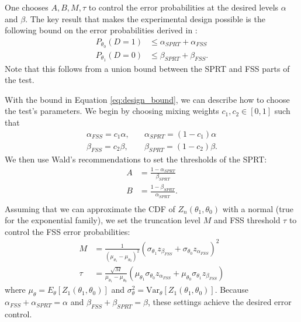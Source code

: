 \documentclass[11pt]{article}
\begin{document}
One chooses $A, B, M, \tau$ to control the error probabilities at the desired levels $\alpha$ and $\beta$. The key result that makes the experimental design possible is the following bound on the error probabilities derived in \citet{tantara1977}:
\begin{equation}\label{eq:design_bound}
\begin{split}
P_{\theta_0}(D = 1) &\leq \alpha_{SPRT} + \alpha_{FSS} \\
P_{\theta_1}(D = 0) &\leq \beta_{SPRT} + \beta_{FSS}.
\end{split}
\end{equation}
Note that this follows from a union bound between the SPRT and FSS parts of the test.

With the bound in Equation \ref{eq:design_bound}, we can describe how to choose the test's parameters. We begin by choosing mixing weights $c_1, c_2 \in \left[0, 1\right]$ such that
\begin{equation}
\begin{split}
\alpha_{FSS} = c_1 \alpha, \quad &\alpha_{SPRT} = (1 - c_1) \alpha \\
\beta_{FSS} = c_2 \beta, \quad &\beta_{SPRT} = (1 - c_2) \beta.
\end{split}
\end{equation}
We then use Wald's recommendations to set the thresholds of the SPRT:
\begin{equation}
\begin{split}
A &= \frac{1 - \alpha_{SPRT}}{\beta_{SPRT}} \\
B &= \frac{1 - \beta_{SPRT}}{\alpha_{SPRT}}. \\
\end{split}
\end{equation}
Assuming that we can approximate the CDF of $Z_n(\theta_1, \theta_0)$ with a normal (true for the exponential family), we set the truncation level $M$ and FSS threshold $\tau$ to control the FSS error probabilities:
\begin{equation}
\begin{split}
M &= \frac{1}{(\mu_{\theta_1} - \mu_{\theta_0})^2} \left(\sigma_{\theta_1} z_{\beta_{FSS}} + \sigma_{\theta_0}z_{\alpha_{FSS}}\right)^2 \\
\tau &= \frac{\sqrt{M}}{\mu_{\theta_1} - \mu_{\theta_0}} \left(\mu_{\theta_1} \sigma_{\theta_0} z_{\alpha_{FSS}} + \mu_{\theta_0} \sigma_{\theta_1} z_{\beta_{FSS}}\right)
\end{split}
\end{equation}
where $\mu_{\theta} = E_{\theta}\left[Z_1(\theta_1, \theta_0)\right]$ and $\sigma^2_{\theta} = \text{Var}_{\theta}\left[Z_1(\theta_1, \theta_0)\right]$. Because $\alpha_{FSS} + \alpha_{SPRT} = \alpha$ and $\beta_{FSS} + \beta_{SPRT} = \beta$, these settings achieve the desired error control.
\end{document}
